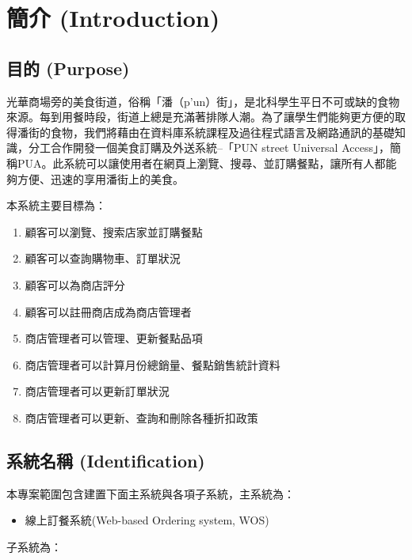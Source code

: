 \documentclass[a4paper, 12pt]{article}
\begin{document}


\section{簡介 (Introduction)}

\subsection{目的 (Purpose)}

光華商場旁的美食街道，俗稱「潘（p'un）街」，是北科學生平日不可或缺的食物來源。每到用餐時段，街道上總是充滿著排隊人潮。為了讓學生們能夠更方便的取得潘街的食物，我們將藉由在資料庫系統課程及過往程式語言及網路通訊的基礎知識，分工合作開發一個美食訂購及外送系統--「PUN street Universal Access」，簡稱PUA。此系統可以讓使用者在網頁上瀏覽、搜尋、並訂購餐點，讓所有人都能夠方便、迅速的享用潘街上的美食。

\noindent 本系統主要目標為：
\begin{enumerate}
  \item 顧客可以瀏覽、搜索店家並訂購餐點
  \item 顧客可以查詢購物車、訂單狀況
  \item 顧客可以為商店評分
  \item 顧客可以註冊商店成為商店管理者
  \item 商店管理者可以管理、更新餐點品項
  \item 商店管理者可以計算月份總銷量、餐點銷售統計資料
  \item 商店管理者可以更新訂單狀況
  \item 商店管理者可以更新、查詢和刪除各種折扣政策
\end{enumerate}


\subsection{系統名稱 (Identification)}

\noindent 本專案範圍包含建置下面主系統與各項子系統，主系統為：

\begin{itemize}
  \item 線上訂餐系統(Web-based Ordering system, WOS)
\end{itemize}

\noindent 子系統為：
\end{document}
